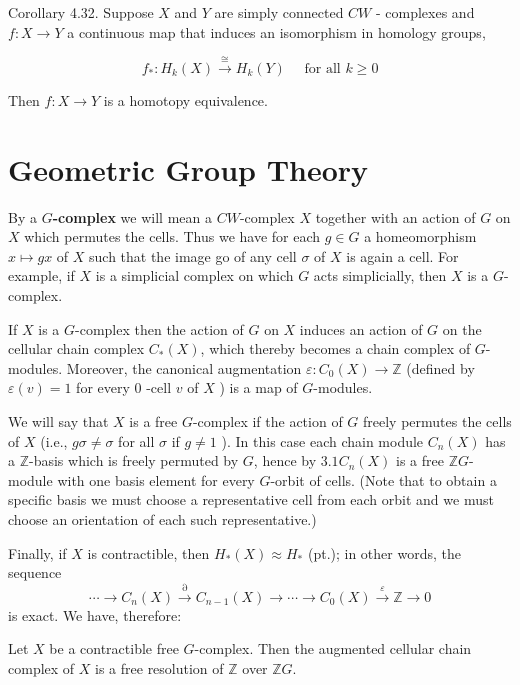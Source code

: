 \begin{coro}
    Corollary 4.32. Suppose $X$ and $Y$ are simply connected $C W$ - complexes and $f: X \rightarrow Y$ a continuous map that induces an isomorphism in homology groups,

    $$
    f_*: H_k(X) \xrightarrow{\cong} H_k(Y) \quad \text { for all } k \geq 0
    $$
    
    
    Then $f: X \rightarrow Y$ is a homotopy equivalence. 
\end{coro}





\chapter{Geometric Group Theory}

By a \textbf{$G$-complex} we will mean a $C W$-complex $X$ together with an action of $G$ on $X$ which permutes the cells. Thus we have for each $g \in G$ a homeomorphism $x \mapsto g x$ of $X$ such that the image go of any cell $\sigma$ of $X$ is again a cell. For example, if $X$ is a simplicial complex on which $G$ acts simplicially, then $X$ is a $G$-complex.

If $X$ is a $G$-complex then the action of $G$ on $X$ induces an action of $G$ on the cellular chain complex $C_*(X)$, which thereby becomes a chain complex of $G$-modules. Moreover, the canonical augmentation $\varepsilon: C_0(X) \rightarrow \mathbb{Z}$ (defined by $\varepsilon(v)=1$ for every 0 -cell $v$ of $X$ ) is a map of $G$-modules.

We will say that $X$ is a free $G$-complex if the action of $G$ freely permutes the cells of $X$ (i.e., $g \sigma \neq \sigma$ for all $\sigma$ if $g \neq 1$ ). In this case each chain module $C_n(X)$ has a $\mathbb{Z}$-basis which is freely permuted by $G$, hence by $3.1 C_n(X)$ is a free $\mathbb{Z} G$-module with one basis element for every $G$-orbit of cells. (Note that to obtain a specific basis we must choose a representative cell from each orbit and we must choose an orientation of each such representative.)

Finally, if $X$ is contractible, then $H_*(X) \approx H_*$ (pt.); in other words, the sequence
$$
\cdots \rightarrow C_n(X) \stackrel{\partial}{\rightarrow} C_{n-1}(X) \rightarrow \cdots \rightarrow C_0(X) \stackrel{\varepsilon}{\rightarrow} \mathbb{Z} \rightarrow 0
$$
is exact. We have, therefore:

\begin{prop}
    
    Let $X$ be a contractible free $G$-complex. Then the augmented cellular chain complex of $X$ is a free resolution of $\mathbb{Z}$ over $\mathbb{Z} G$.
\end{prop}




